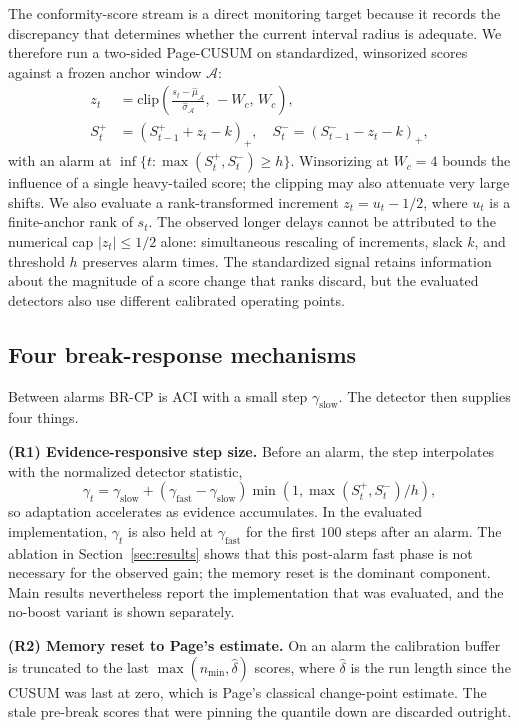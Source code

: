 \documentclass[10pt]{article}
\newcommand{\brcp}{\textsc{BR-CP}}
\begin{document}
The conformity-score stream is a direct monitoring target because it records the discrepancy that determines whether the current interval radius is adequate. We therefore run a two-sided Page-CUSUM on standardized, winsorized
scores against a frozen anchor window $\mathcal{A}$:
\begin{align}
z_t &= \mathrm{clip}\!\left(\frac{s_t - \hat\mu_\mathcal{A}}
{\hat\sigma_\mathcal{A}},\, -W_c,\, W_c\right), \\
S^{+}_t &= \left(S^{+}_{t-1} + z_t - k\right)_{+}, \quad
S^{-}_t = \left(S^{-}_{t-1} - z_t - k\right)_{+},
\end{align}
with an alarm at $\inf\{t: \max(S^+_t,S^-_t) \ge h\}$. Winsorizing at $W_c=4$
bounds the influence of a single heavy-tailed score; the clipping may also attenuate very large shifts. We also evaluate a rank-transformed increment $z_t=u_t-1/2$, where $u_t$ is a finite-anchor rank of $s_t$. The observed longer delays cannot be attributed to the numerical cap $|z_t|\leq 1/2$ alone: simultaneous rescaling of increments, slack $k$, and threshold $h$ preserves alarm times. The standardized signal retains information about the magnitude of a score change that ranks discard, but the evaluated detectors also use different calibrated operating points.

\subsection{Four break-response mechanisms}

Between alarms \brcp{} is ACI with a small step $\gamma_{\text{slow}}$. The
detector then supplies four things.

\textbf{(R1) Evidence-responsive step size.} Before an alarm, the step
interpolates with the normalized detector statistic,
\begin{equation}
\gamma_t = \gamma_{\text{slow}} + (\gamma_{\text{fast}}-\gamma_{\text{slow}})
\min\!\left(1, \max(S^+_t,S^-_t)/h\right),
\end{equation}
so adaptation accelerates as evidence accumulates. In the evaluated implementation,
$\gamma_t$ is also held at $\gamma_{\text{fast}}$ for the first $100$ steps after
an alarm. The ablation in Section~\ref{sec:results} shows that this post-alarm fast
phase is not necessary for the observed gain; the memory reset is the dominant
component. Main results nevertheless report the implementation that was evaluated,
and the no-boost variant is shown separately.

\textbf{(R2) Memory reset to Page's estimate.} On an alarm the calibration
buffer is truncated to the last $\max(n_{\min}, \hat\delta)$ scores, where
$\hat\delta$ is the run length since the CUSUM was last at zero, which is Page's
classical change-point estimate. The stale pre-break scores that were pinning
the quantile down are discarded outright.
\end{document}
